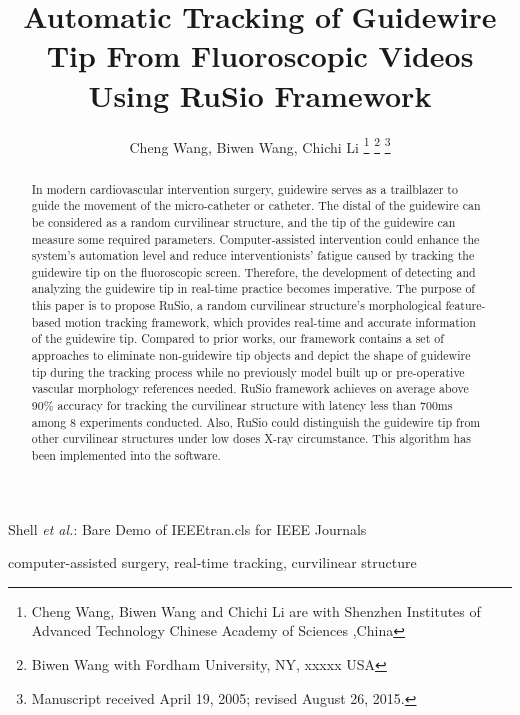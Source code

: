 \documentclass[journal]{IEEEtran}
\begin{document}
\title{Automatic Tracking of Guidewire Tip From Fluoroscopic Videos Using RuSio Framework}


\author{Cheng Wang, Biwen Wang, Chichi Li
\thanks{Cheng Wang, Biwen Wang and Chichi Li are with Shenzhen Institutes of Advanced Technology Chinese Academy of Sciences ,China}
\thanks{Biwen Wang with Fordham University, NY, xxxxx USA}
\thanks{Manuscript received April 19, 2005; revised August 26, 2015.}}


{Shell \MakeLowercase{\textit{et al.}}: Bare Demo of IEEEtran.cls for IEEE Journals}


\maketitle


\begin{abstract}
In modern cardiovascular intervention surgery, guidewire serves as a trailblazer to guide the movement of the micro-catheter or catheter. The distal of the guidewire can be considered as a random curvilinear structure, and the tip of the guidewire can measure some required parameters. Computer-assisted intervention could enhance the system's automation level and reduce interventionists' fatigue caused by tracking the guidewire tip on the fluoroscopic screen. Therefore, the development of detecting and analyzing the guidewire tip in real-time practice becomes imperative. The purpose of this paper is to propose RuSio, a random curvilinear structure's morphological feature-based motion tracking framework, which provides real-time and accurate information of the guidewire tip. Compared to prior works, our framework contains a set of approaches to eliminate non-guidewire tip objects and depict the shape of guidewire tip during the tracking process while no previously model built up or pre-operative vascular morphology references needed. RuSio framework achieves on average above 90\% accuracy for tracking the curvilinear structure with latency less than 700ms among 8 experiments conducted. Also, RuSio could distinguish the guidewire tip from other curvilinear structures under low doses X-ray circumstance. This algorithm has been implemented into the software.
\end{abstract}


\begin{IEEEkeywords}
computer-assisted surgery, real-time tracking, curvilinear structure
\end{IEEEkeywords}
\end{document}
